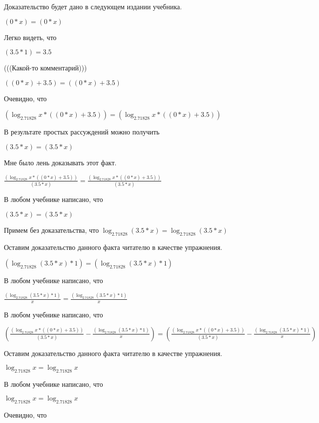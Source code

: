 \documentclass[12pt,a4paper,fleqn]{article}
\theoremstyle{definition}
\begin{document}
Доказательство будет дано в следующем издании учебника.

$( 0  *  x ) = ( 0  *  x )$

Легко видеть, что

$( 3.5  *  1 ) =  3.5 $

(((Какой-то комментарий)))

$(( 0  *  x ) +  3.5 ) = (( 0  *  x ) +  3.5 )$

Очевидно, что

$(\log_{ 2.71828 }{ x } * (( 0  *  x ) +  3.5 )) = (\log_{ 2.71828 }{ x } * (( 0  *  x ) +  3.5 ))$

В результате простых рассуждений можно получить

$( 3.5  *  x ) = ( 3.5  *  x )$

Мне было лень доказывать этот факт.

$\frac{(\log_{ 2.71828 }{ x } * (( 0  *  x ) +  3.5 ))}{( 3.5  *  x )}
 = \frac{(\log_{ 2.71828 }{ x } * (( 0  *  x ) +  3.5 ))}{( 3.5  *  x )}
$

В любом учебнике написано, что

$( 3.5  *  x ) = ( 3.5  *  x )$

Примем без доказательства, что
$\log_{ 2.71828 }{( 3.5  *  x )} = \log_{ 2.71828 }{( 3.5  *  x )}$

Оставим доказательство данного факта читателю в качестве упражнения.

$(\log_{ 2.71828 }{( 3.5  *  x )} *  1 ) = (\log_{ 2.71828 }{( 3.5  *  x )} *  1 )$

В любом учебнике написано, что

$\frac{(\log_{ 2.71828 }{( 3.5  *  x )} *  1 )}{ x }
 = \frac{(\log_{ 2.71828 }{( 3.5  *  x )} *  1 )}{ x }
$

В любом учебнике написано, что

$(\frac{(\log_{ 2.71828 }{ x } * (( 0  *  x ) +  3.5 ))}{( 3.5  *  x )}
 - \frac{(\log_{ 2.71828 }{( 3.5  *  x )} *  1 )}{ x }
) = (\frac{(\log_{ 2.71828 }{ x } * (( 0  *  x ) +  3.5 ))}{( 3.5  *  x )}
 - \frac{(\log_{ 2.71828 }{( 3.5  *  x )} *  1 )}{ x }
)$

Оставим доказательство данного факта читателю в качестве упражнения.

$\log_{ 2.71828 }{ x } = \log_{ 2.71828 }{ x }$

В любом учебнике написано, что

$\log_{ 2.71828 }{ x } = \log_{ 2.71828 }{ x }$

Очевидно, что
\end{document}
